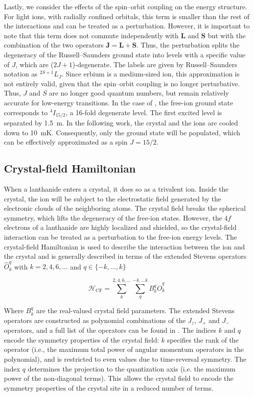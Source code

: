 Lastly, we consider the effects of the spin--orbit coupling on the energy structure. For light ions, with radially confined orbitals, this term is smaller than the rest of the interactions and can be treated as a perturbation. However, it is important to note that this term does not commute independently with $\mathbf{L}$ and $\mathbf{S}$ but with the combination of the two operators $\mathbf{J} = \mathbf{L} + \mathbf{S}$. Thus, the perturbation splits the degeneracy of the Russell--Saunders ground state into levels with a specific value of $J$, which are ($2J+1$)-degenerate. The labels are given by Russell--Saunders notation as $^{2S+1}L_J$. Since erbium is a medium-sized ion, this approximation is not entirely valid, given that the spin--orbit coupling is no longer perturbative. Thus, $J$ and $S$ are no longer good quantum numbers, but remain relatively accurate for low-energy transitions. In the case of \Er, the free-ion ground state corresponds to $^4I_{15/2}$, a 16-fold degenerate level. The first excited level is separated by 1.5~\textmu m. In the following work, the \Ca crystal and the ions are cooled down to 10~mK. Consequently, only the ground state will be populated, which can be effectively approximated as a spin $J=15/2$.

\subsection{Crystal-field Hamiltonian}
When a lanthanide enters a crystal, it does so as a trivalent ion. Inside the crystal, the ion will be subject to the electrostatic field generated by the electronic clouds of the neighboring atoms. The crystal field breaks the spherical symmetry, which lifts the degeneracy of the free-ion states. However, the $4f$ electrons of a lanthanide are highly localized and shielded, so the crystal-field interaction can be treated as a perturbation to the free-ion energy levels. The crystal-field Hamiltonian is used to describe the interaction between the ion and the crystal and is generally described in terms of the extended Stevens operators $\hat{O}^q_k$ with $k=2,4,6,\dots$ and $q \in \{-k,\dots, k\}$ \cite{abragam_electron_2012, stevens_matrix_1952}

\begin{equation}
    \mathcal{H}_{\mathrm{CF}} = \sum_{k}^{2,4,6,\dots}\sum_{q}^{-k,...k} B_k^q \hat{O}^q_k \,
\end{equation}

Where $B_k^q$ are the real-valued crystal field parameters. The extended Stevens operators are constructed as polynomial combinations of the $J_z$, $J_+$ and $J_-$ operators, and a full list of the operators can be found in \cite{altshuler_electron_1964}. The indices $k$ and $q$ encode the symmetry properties of the crystal field: $k$ specifies the rank of the operator (i.e., the maximum total power of angular momentum operators in the polynomial), and is restricted to even values due to time-reversal symmetry. The index $q$ determines the projection to the quantization axis (i.e. the maximum power of the non-diagonal terms). This allows the crystal field to encode the symmetry properties of the crystal site in a reduced number of terms. 

